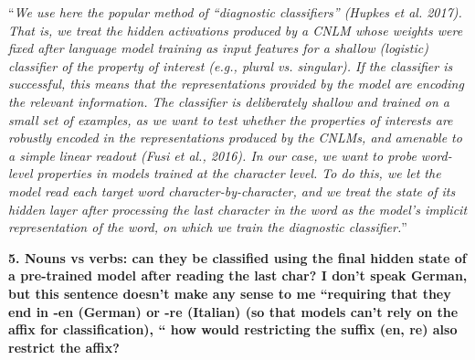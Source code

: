 \documentclass{article}
\begin{document}
``\textit{We use here the popular method of ``diagnostic classifiers'' (Hupkes et al. 2017). That is, we treat the hidden activations produced by a CNLM whose weights were fixed after language model training as input features for a shallow (logistic) classifier of the property of interest (e.g., plural vs. singular). If the classifier is successful, this means that the representations provided by the model are encoding the relevant information.  The classifier is deliberately shallow and trained on a small set of examples, as we want to test whether the properties of interests are robustly encoded in the representations produced by the CNLMs, and amenable to a simple linear readout (Fusi et al., 2016). In our case, we want to probe word-level properties in models trained at the character level. To do this, we let the model read each target word character-by-character, and we treat the state of its hidden layer after processing the last character in the word as the model's implicit representation of the word, on which we train the diagnostic classifier.}''
\newline

\textbf{5. Nouns vs verbs: can they be classified using the final hidden state of a pre-trained model after reading the last char? I don't speak German, but this sentence doesn't make any sense to me ``requiring that they end in -en (German) or -re (Italian) (so that models can’t rely on the affix for classification), `` how would restricting the suffix (en, re) also restrict the affix?}
\end{document}
